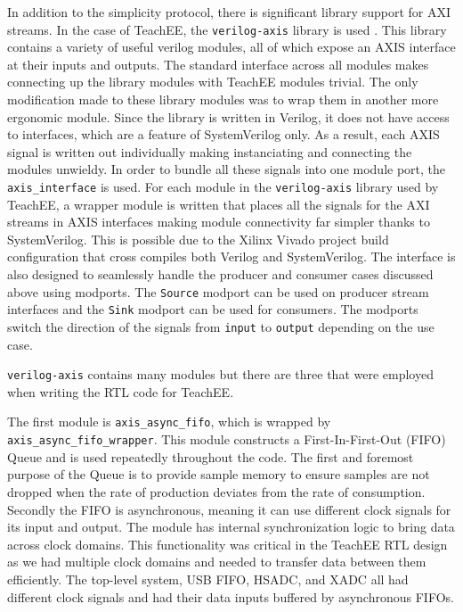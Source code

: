 \documentclass[letterpaper,11pt]{article}
\newcommand{\code}[1]{\texttt{#1}}
\begin{document}
In addition to the simplicity protocol, there is significant library support for
AXI streams. In the case of TeachEE, the \code{verilog-axis} library is used
\cite{verilog_axis_lib}. This library contains a variety of useful verilog
modules, all of which expose an AXIS interface at their inputs and outputs. The
standard interface across all modules makes connecting up the library modules
with TeachEE modules trivial. The only modification made to these library
modules was to wrap them in another more ergonomic module. Since the library is
written in Verilog, it does not have access to interfaces, which are a feature
of SystemVerilog only. As a result, each AXIS signal is written out individually
making instanciating and connecting the modules unwieldy. In order to bundle all
these signals into one module port, the \code{axis_interface} is used. For each
module in the \code{verilog-axis} library used by TeachEE, a wrapper module is
written that places all the signals for the AXI streams in AXIS interfaces
making module connectivity far simpler thanks to SystemVerilog. This is possible
due to the Xilinx Vivado project build configuration that cross compiles both
Verilog and SystemVerilog. The interface is also designed to seamlessly handle
the producer and consumer cases discussed above using modports. The
\code{Source} modport can be used on producer stream interfaces and the
\code{Sink} modport can be used for consumers. The modports switch the direction
of the signals from \code{input} to \code{output} depending on the use case.

\code{verilog-axis} contains many modules but there are three that were employed
when writing the RTL code for TeachEE. 

The first module is \code{axis_async_fifo}, which is wrapped by
\code{axis_async_fifo_wrapper}. This module constructs a First-In-First-Out
(FIFO) Queue and is used repeatedly throughout the code. The first and foremost
purpose of the Queue is to provide sample memory to ensure samples are not
dropped when the rate of production deviates from the rate of consumption.
Secondly the FIFO is asynchronous, meaning it can use different clock signals
for its input and output. The module has internal synchronization logic to bring
data across clock domains. This functionality was critical in the TeachEE RTL
design as we had multiple clock domains and needed to transfer data between them
efficiently. The top-level system, USB FIFO, HSADC, and XADC all had different
clock signals and had their data inputs buffered by asynchronous FIFOs.
\end{document}

